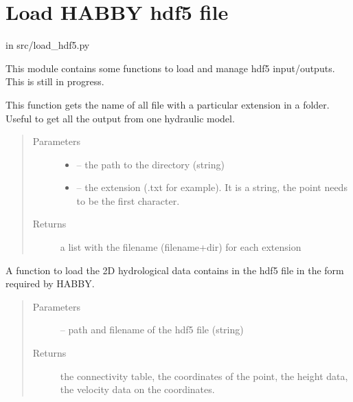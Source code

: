 \documentclass[letterpaper,10pt,english]{sphinxmanual}
\begin{document}
\section{Load HABBY hdf5 file}
\label{\detokenize{index:load-habby-hdf5-file}}
in src/load\_hdf5.py

This module contains some functions to load and manage hdf5 input/outputs. This is still in progress.
\label{\detokenize{index:module-src.load_hdf5}}

\begin{fulllineitems}
\label{\detokenize{index:src.load_hdf5.get_all_filename}}
This function gets the name of all file with a particular extension in a folder. Useful to get all the output
from one hydraulic model.
\begin{quote}\begin{description}
\item[{Parameters}] \leavevmode\begin{itemize}
\item {} 
 -- the path to the directory (string)

\item {} 
 -- the extension (.txt for example). It is a string, the point needs to be the first character.

\end{itemize}

\item[{Returns}] \leavevmode
a list with the filename (filename+dir) for each extension

\end{description}\end{quote}

\end{fulllineitems}


\begin{fulllineitems}
\label{\detokenize{index:src.load_hdf5.load_hdf5_hyd}}
A function to load the 2D hydrological data contains in the hdf5 file in the form required by HABBY.
\begin{quote}\begin{description}
\item[{Parameters}] \leavevmode
{} -- path and filename of the hdf5 file (string)

\item[{Returns}] \leavevmode
the connectivity table, the coordinates of the point, the height data, the velocity data on the coordinates.

\end{description}\end{quote}

\end{fulllineitems}
\end{document}

